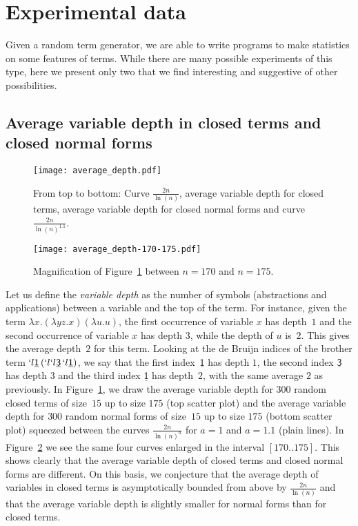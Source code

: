 \documentclass{jfp1}
\newcommand{\Var}[1]{\underline{\mathsf{#1}}}
\begin{document}
\section{Experimental data}
\label{sec:exper-data}

Given a random term generator, we are able to write programs to make statistics on some
features of terms.  While there are many possible experiments of this type, here we
present only two that we find interesting and suggestive of other possibilities. 






\subsection{Average variable depth in closed terms and closed normal forms}
\label{sec:avearge-depth-var}

\begin{figure}[htb!]
  \centering
  \texttt{[image: average\_depth.pdf]}
  \caption{\textsf{From top to bottom:} Curve $\frac{2n}{\ln(n)}$, average variable
    depth for closed terms, average variable depth for closed normal forms and curve
    $\frac{2n}{\ln(n)^{1.1}}$.}
  \label{fig:av_depth}
\end{figure}

\begin{figure}[htb!]
  \centering
  \texttt{[image: average\_depth-170-175.pdf]}
  \caption{Magnification of Figure~\ref{fig:av_depth} between $n=170$ and $n=175$.}
  \label{fig:av_depth_170_175}
\end{figure}

Let us define the \emph{variable depth} as the number of symbols (abstractions and
applications) between a variable and the top of the term. For instance, given the
term $\lambda x.(\lambda y z.x) (\lambda u.u)$, the first occurrence of variable $x$
has depth~$1$ and the second occurrence of variable $x$ has depth $3$, while the
depth of $u$ is~$2$.  This gives the average depth~$2$ for this term.  Looking at the de
Bruijn indices of the brother term $`l \Var{1} \,(`l `l \Var{3}\, `l \Var{1})$, we
say that the first index~$\Var{1}$ has depth $1$, the second index $\Var{3}$ has
depth $3$ and the third index $\Var{1}$ has depth~$2$, with the same average $2$ as
previously.  In Figure~\ref{fig:av_depth}, we draw the average variable depth for
$300$ random closed terms of size~$15$ up to size $175$ (top scatter plot) and the average
variable depth for $300$ random normal forms of size~$15$ up to size $175$ (bottom
scatter plot) squeezed between the curves $\frac{2n}{\ln(n)^a}$ for $a=1$ and $a=1.1$
(plain lines).  In Figure~\ref{fig:av_depth_170_175} we see the same four curves
enlarged in the interval $[170..175]$.  This shows clearly that the
average variable depth of closed terms and closed normal forms are different.  On this basis, we
conjecture that the average depth of variables in closed terms is asymptotically bounded from above by
$\frac{2n}{\ln(n)}$ and that the average variable depth is slightly smaller for
normal forms than for closed terms.
\end{document}
